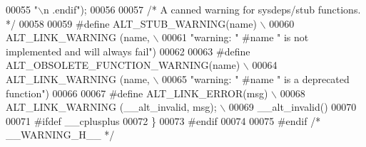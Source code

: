 \begin{DoxyCode}
00055 \textcolor{preprocessor}{          "\(\backslash\)n .endif");}
00056 
00057 \textcolor{comment}{/* A canned warning for sysdeps/stub functions.  */}
00058 
00059 \textcolor{preprocessor}{#define ALT\_STUB\_WARNING(name) \(\backslash\)}
00060 \textcolor{preprocessor}{  ALT\_LINK\_WARNING (name, \(\backslash\)}
00061 \textcolor{preprocessor}{    "warning: " #name " is not implemented and will always fail")}
00062 
00063 \textcolor{preprocessor}{#define ALT\_OBSOLETE\_FUNCTION\_WARNING(name) \(\backslash\)}
00064 \textcolor{preprocessor}{  ALT\_LINK\_WARNING (name, \(\backslash\)}
00065 \textcolor{preprocessor}{    "warning: " #name " is a deprecated function")}
00066 
00067 \textcolor{preprocessor}{#define ALT\_LINK\_ERROR(msg) \(\backslash\)}
00068 \textcolor{preprocessor}{  ALT\_LINK\_WARNING (\_\_alt\_invalid, msg); \(\backslash\)}
00069 \textcolor{preprocessor}{  \_\_alt\_invalid()}
00070 
00071 \textcolor{preprocessor}{#ifdef \_\_cplusplus}
00072 \}
00073 \textcolor{preprocessor}{#endif}
00074 
00075 \textcolor{preprocessor}{#endif }\textcolor{comment}{/* \_\_WARNING\_H\_\_ */}\textcolor{preprocessor}{}
\end{DoxyCode}
